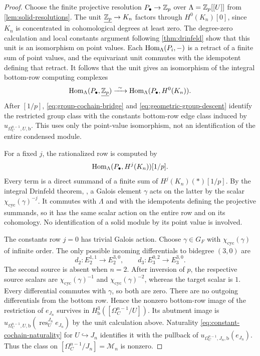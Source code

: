 \begin{proof}
Choose the finite projective resolution
$P_\bullet\to\mathbb Z_p$ over $\Lambda=\mathbb Z_p[[U]]$ from
\cref{lem:solid-resolutions}.  The unit
$\underline{\mathbb Z_p}\to K_n$ factors through $H^0(K_n)[0]$, since
$K_n$ is concentrated in cohomological degrees at least zero.
The degree-zero calculation and local constants argument following
\cref{thm:drinfeld} show that this unit is an isomorphism on point
values.  Each $\operatorname{Hom}_\Lambda(P_i,-)$ is a retract of a finite sum of
point values, and the equivariant unit commutes with the idempotent
defining that retract.  It follows that the unit gives an isomorphism
of the integral bottom-row computing complexes
\[
 \operatorname{Hom}_\Lambda(P_\bullet,\underline{\mathbb Z_p})
       \xrightarrow{\ \sim\ }
 \operatorname{Hom}_\Lambda(P_\bullet,H^0(K_n)).
\]
After $[1/p]$, \eqref{eq:group-cochain-bridge} and
\eqref{eq:geometric-group-descent} identify the restricted group
class with the constants bottom-row edge class induced by
$u_{\Omega_C^{n-1},U,\mathrm b}$.  This uses only the point-value
isomorphism, not an identification of the entire condensed module.

For a fixed $j$, the rationalized row is
computed by
\[
 \operatorname{Hom}_\Lambda(P_\bullet,H^j(K_n))[1/p].
\]
Every term is a direct summand of a finite sum of
$H^j(K_n)(*)[1/p]$.  By the integral Drinfeld theorem,
\cite[Theorem 1.1]{CDN2021}, a Galois element $\gamma$ acts on the latter
by the scalar $\chi_{\mathrm{cyc}}(\gamma)^{-j}$.
It commutes with $\Lambda$ and with the idempotents defining the
projective summands, so it has the same scalar action on the entire
row and on its cohomology.  No identification of a solid module by
its point value is involved.

The constants row $j=0$ has trivial Galois action.
Choose $\gamma\in G_F$ with $\chi_{\mathrm{cyc}}(\gamma)$ of infinite
order.  The only possible incoming differentials to bidegree $(3,0)$
are
\[
 d_2:E_2^{1,1}\longrightarrow E_2^{3,0},
 \qquad
 d_3:E_3^{0,2}\longrightarrow E_3^{3,0}.
\]
The second source is absent when $n=2$.
After inversion of $p$, the respective source scalars are
$\chi_{\mathrm{cyc}}(\gamma)^{-1}$ and
$\chi_{\mathrm{cyc}}(\gamma)^{-2}$, whereas the target scalar is $1$.
Every differential commutes with $\gamma$, so both are zero.
There are no outgoing differentials from the bottom row.
Hence the nonzero bottom-row image of the restriction of $e_{J_n}$
survives in $H^3_{\mathrm b}([\Omega_C^{n-1}/U])$.
Its abutment image is
$u_{\Omega_C^{n-1},U,\mathrm b}(\operatorname{res}^{J_n}_U e_{J_n})$
by the unit calculation
above.  Naturality \eqref{eq:constant-cochain-naturality} for
$U\hookrightarrow J_n$ identifies it with the pullback of
$u_{\Omega_C^{n-1},J_n,\mathrm b}(e_{J_n})$.
Thus the class on $[\Omega_C^{n-1}/J_n]=\mathcal M_n$ is nonzero.


\end{proof}
